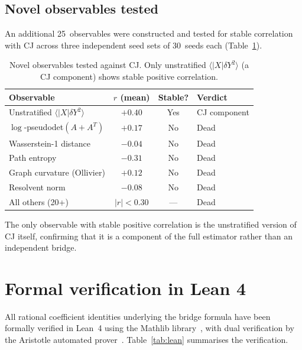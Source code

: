 \documentclass[12pt,a4paper]{article}
\theoremstyle{plain}
\theoremstyle{definition}
\theoremstyle{remark}
\begin{document}
\subsection{Novel observables tested}
\label{sec:novel-obs}

An additional 25~observables were constructed and tested for
stable correlation with CJ across three independent seed sets
of 30~seeds each (Table~\ref{tab:novel}).

\begin{table}[ht]
\centering
\caption{Novel observables tested against CJ.  Only unstratified
$\langle |X| \delta Y^2 \rangle$ (a CJ component) shows
stable positive correlation.}
\label{tab:novel}
\begin{tabular}{lccl}
\toprule
Observable & $r$ (mean) & Stable? & Verdict \\
\midrule
Unstratified $\langle|X|\delta Y^2\rangle$ & $+0.40$ & Yes & CJ component \\
$\log$-pseudodet$(A+A^T)$ & $+0.17$ & No & Dead \\
Wasserstein-1 distance & $-0.04$ & No & Dead \\
Path entropy & $-0.31$ & No & Dead \\
Graph curvature (Ollivier) & $+0.12$ & No & Dead \\
Resolvent norm & $-0.08$ & No & Dead \\
All others (20+) & $|r| < 0.30$ & --- & Dead \\
\bottomrule
\end{tabular}
\end{table}

The only observable with stable positive correlation is the
unstratified version of CJ itself, confirming that it is a
component of the full estimator rather than an independent bridge.

\section{Formal verification in Lean 4}
\label{sec:lean}

All rational coefficient identities underlying the bridge formula
have been formally verified in Lean~4 using the Mathlib
library~\cite{Mathlib:2024}, with dual verification by the
Aristotle automated prover~\cite{Aristotle:2025}.
Table~\ref{tab:lean} summarises the verification.
\end{document}
